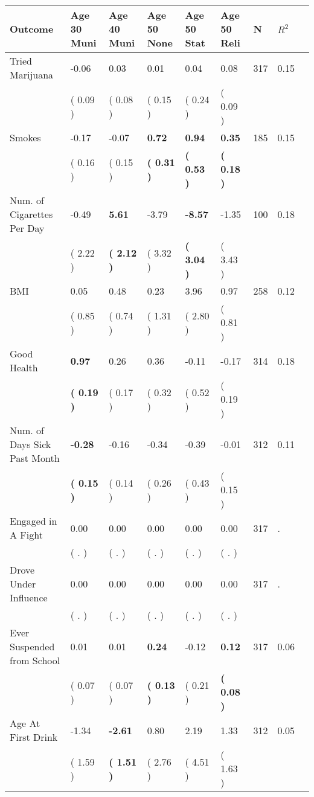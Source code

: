 \begin{tabular}{L{6.2cm} C{1.8cm} C{1.8cm} C{1.8cm} C{1.8cm} C{1.8cm} C{1.8cm} C{0.3cm} C{0.3cm}}
\toprule
 \textbf{Outcome} & \textbf{Age 30 Muni} & \textbf{Age 40 Muni} & \textbf{Age 50 None} & \textbf{Age 50 Stat} & \textbf{Age 50 Reli} & \textbf{N} & \textbf{$ R^2$} \\
\midrule
Tried Marijuana &     -0.06 &      0.03 &      0.01 &      0.04 &      0.08  & 317 &       0.15 \\ 
 & (     0.09 ) & (     0.08 ) & (     0.15 ) & (     0.24 ) & (     0.09 )  & \\
Smokes &     -0.17 &     -0.07 & \textbf{     0.72} & \textbf{     0.94} & \textbf{     0.35}  & 185 &       0.15 \\ 
 & (     0.16 ) & (     0.15 ) & \textbf{(     0.31 )} & \textbf{(     0.53 )} & \textbf{(     0.18 )}  & \\
Num. of Cigarettes Per Day &     -0.49 & \textbf{     5.61} &     -3.79 & \textbf{    -8.57} &     -1.35  & 100 &       0.18 \\ 
 & (     2.22 ) & \textbf{(     2.12 )} & (     3.32 ) & \textbf{(     3.04 )} & (     3.43 )  & \\
BMI &      0.05 &      0.48 &      0.23 &      3.96 &      0.97  & 258 &       0.12 \\ 
 & (     0.85 ) & (     0.74 ) & (     1.31 ) & (     2.80 ) & (     0.81 )  & \\
Good Health & \textbf{     0.97} &      0.26 &      0.36 &     -0.11 &     -0.17  & 314 &       0.18 \\ 
 & \textbf{(     0.19 )} & (     0.17 ) & (     0.32 ) & (     0.52 ) & (     0.19 )  & \\
Num. of Days Sick Past Month & \textbf{    -0.28} &     -0.16 &     -0.34 &     -0.39 &     -0.01  & 312 &       0.11 \\ 
 & \textbf{(     0.15 )} & (     0.14 ) & (     0.26 ) & (     0.43 ) & (     0.15 )  & \\
Engaged in A Fight &      0.00 &      0.00 &      0.00 &      0.00 &      0.00  & 317 &          . \\ 
 & (        . ) & (        . ) & (        . ) & (        . ) & (        . )  & \\
Drove Under Influence &      0.00 &      0.00 &      0.00 &      0.00 &      0.00  & 317 &          . \\ 
 & (        . ) & (        . ) & (        . ) & (        . ) & (        . )  & \\
Ever Suspended from School &      0.01 &      0.01 & \textbf{     0.24} &     -0.12 & \textbf{     0.12}  & 317 &       0.06 \\ 
 & (     0.07 ) & (     0.07 ) & \textbf{(     0.13 )} & (     0.21 ) & \textbf{(     0.08 )}  & \\
Age At First Drink &     -1.34 & \textbf{    -2.61} &      0.80 &      2.19 &      1.33  & 312 &       0.05 \\ 
 & (     1.59 ) & \textbf{(     1.51 )} & (     2.76 ) & (     4.51 ) & (     1.63 )  & \\
\bottomrule
\end{tabular}
